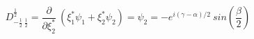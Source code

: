 \begin{equation}
D_{-\frac{1}{2}~\frac{1}{2}}^{\frac{1}{2}}= \frac{\partial}{\partial \xi_2^*}~(\xi_1^* \psi_1 +\xi_2^* \psi_2)= \psi_2= -e^{i(\gamma - \alpha)/2}~sin(\frac{\beta}{2})
\end{equation}

